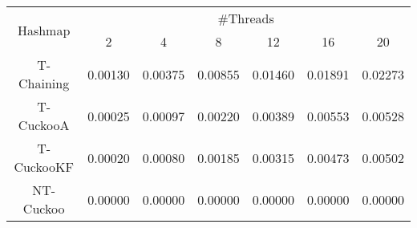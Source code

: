 \begin{tabular}{|c|c|c|c|c|c|c|}
\hline
\multirow{2}{*}{Hashmap} & \multicolumn{6}{c|}{\#Threads}\\\cline{2-7}& 2 & 4 & 8 & 12 & 16 & 20\\
\hline
\hline
T-Chaining & 0.00130 & 0.00375 & 0.00855 & 0.01460 & 0.01891 & 0.02273\\
T-CuckooA & 0.00025 & 0.00097 & 0.00220 & 0.00389 & 0.00553 & 0.00528\\
T-CuckooKF & 0.00020 & 0.00080 & 0.00185 & 0.00315 & 0.00473 & 0.00502\\
NT-Cuckoo & 0.00000 & 0.00000 & 0.00000 & 0.00000 & 0.00000 & 0.00000\\
\hline
\end{tabular}
